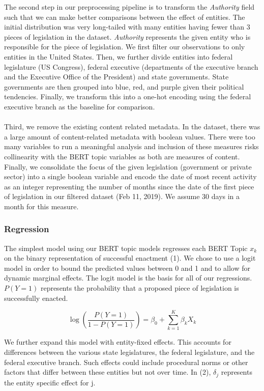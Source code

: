 \documentclass{article}
\begin{document}
\noindent
The second step in our preprocessing pipeline is to transform the \textit{Authority} field such that we can make better comparisons between the effect of entities. The initial distribution was very long-tailed with many entities having fewer than 3 pieces of legislation in the dataset. \textit{Authority} represents the given entity who is responsible for the piece of legislation. We first filter our observations to only entities in the United States. Then, we further divide entities into federal legislature (US Congress), federal executive (departments of the executive branch and the Executive Office of the President) and state governments. State governments are then grouped into blue, red, and purple given their political tendencies. Finally, we transform this into a one-hot encoding using the federal executive branch as the baseline for comparison.
\\\\
Third, we remove the existing content related metadata. In the dataset, there was a large amount of content-related metadata with boolean values. There were too many variables to run a meaningful analysis and inclusion of these measures risks collinearity with the BERT topic variables as both are measures of content. Finally, we consolidate the focus of the given legislation (government or private sector) into a single boolean variable and encode the date of most recent activity as an integer representing the number of months since the date of the first piece of legislation in our filtered dataset (Feb 11, 2019). We assume 30 days in a month for this measure. 

\subsubsection{Regression}

The simplest model using our BERT topic models regresses each BERT Topic $x_k$ on the binary representation of successful enactment (1). We chose to use a logit model in order to bound the predicted values between 0 and 1 and to allow for dynamic marginal effects. The logit model is the basis for all of our regressions. $P(Y=1)$ represents the probability that a proposed piece of legislation is successfully enacted. 

\begin{equation}
\log\left( \frac{P(Y=1)}{1 - P(Y=1)} \right) = \beta_0 + \sum_{k=1}^{K} \beta_k X_k
\end{equation}

We further expand this model with entity-fixed effects. This accounts for differences between the various state legislatures, the federal legislature, and the federal executive branch. Such effects could include procedural norms or other factors that differ between these entities but not over time. In (2), $\delta_j$ represents the entity specific effect for j.
\end{document}
